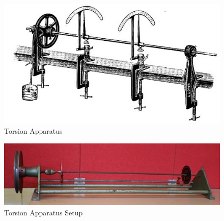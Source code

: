 \documentclass[12pt,a4paper]{article}	%
\begin{document}
	\thispagestyle{empty}	%
\begin{figure}[h!]
	\centering
		\includegraphics[width=\linewidth]{Torsion Apparatus Old.jpg}
		\caption{Torsion Apparatus}
\end{figure}

\begin{figure}[h!]
	\centering
	\includegraphics[width=\linewidth]{Problem Statement Setup.jpg}
	\caption{Torsion Apparatus Setup}
\end{figure}
\end{document}
